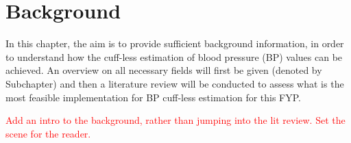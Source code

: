 \section{Background}

In this chapter, the aim is to provide sufficient background information, in order to understand how the cuff-less estimation of blood pressure (BP) values 
can be achieved. An overview on all necessary fields will first be given (denoted by Subchapter) and then a literature review will be conducted to 
assess what is the most feasible implementation for BP cuff-less estimation for this FYP.

\textcolor{red}{Add an intro to the background, rather than jumping into the lit review. Set the scene for the reader.}

